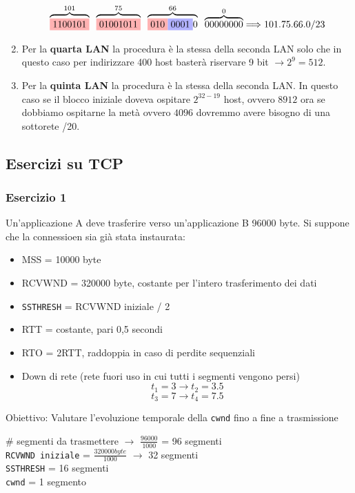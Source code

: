 \documentclass[a4paper]{article}
\begin{document}
\begin{enumerate}
\[\overbrace{\colorbox{red!30!white}{1100101}}^{101} \; \; \overbrace{\colorbox{red!30!white}{01001011}}^{75} \; \; \overbrace{\colorbox{red!30!white}{010}\colorbox{blue!30!white}{0001}0}^{66} \; \; \overbrace{00000000}^{0} \Longrightarrow 101.75.66.0/23\]
\item Per la \textbf{quarta LAN} la procedura è la stessa della seconda LAN solo che in questo caso per indirizzare 400 host basterà riservare 9 bit $\rightarrow 2^9 = 512$.
\item Per la \textbf{quinta LAN} la procedura è la stessa della seconda LAN. In questo caso se il blocco iniziale doveva ospitare $2^{32-19}$ host, ovvero $8912$ ora se dobbiamo ospitarne la metà ovvero $4096$ dovremmo avere bisogno di una sottorete /20.

\end{enumerate}

\subsection{Esercizi su TCP}
\subsubsection{Esercizio 1}

Un'applicazione A deve trasferire verso un'applicazione B 96000 byte. Si suppone che la connessioen sia già
stata instaurata:
\begin{itemize}
    \item MSS = 10000 byte
    \item RCVWND = 320000 byte, costante per l'intero trasferimento dei dati
    \item  \texttt{SSTHRESH} = RCVWND iniziale / 2
    \item RTT = costante, pari 0,5 secondi
    \item RTO = 2RTT, raddoppia in caso di perdite sequenziali
    \item Down di rete (rete fuori uso in cui tutti i segmenti vengono persi)
    \[t_1 = 3 \rightarrow t_2 = 3.5\]
    \[t_3 = 7 \rightarrow t_4 = 7.5\]
\end{itemize}
Obiettivo: Valutare l'evoluzione temporale della \texttt{cwnd} fino a fine a trasmissione

\begin{center}
    
    \# segmenti da trasmettere $\rightarrow$ $\frac{96000}{1000}$ = 96 segmenti\\
    \texttt{RCVWND iniziale} = $\frac{320000 byte}{1000}$  $\rightarrow$ 32 segmenti\\
    \texttt{SSTHRESH} = 16 segmenti\\
    \texttt{cwnd} = 1 segmento
\end{center}
\end{document}
